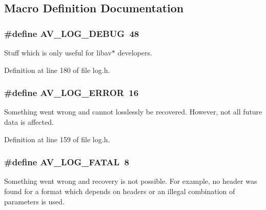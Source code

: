 \subsection{Macro Definition Documentation}
\subsubsection[{\texorpdfstring{A\+V\+\_\+\+L\+O\+G\+\_\+\+D\+E\+B\+UG}{AV_LOG_DEBUG}}]{\setlength{\rightskip}{0pt plus 5cm}\#define A\+V\+\_\+\+L\+O\+G\+\_\+\+D\+E\+B\+UG~48}\hypertarget{group__lavu__log__constants_ga5b7221c3afd06848486776bd834a58a5}{}\label{group__lavu__log__constants_ga5b7221c3afd06848486776bd834a58a5}
Stuff which is only useful for libav$\ast$ developers. 

Definition at line 180 of file log.\+h.

\subsubsection[{\texorpdfstring{A\+V\+\_\+\+L\+O\+G\+\_\+\+E\+R\+R\+OR}{AV_LOG_ERROR}}]{\setlength{\rightskip}{0pt plus 5cm}\#define A\+V\+\_\+\+L\+O\+G\+\_\+\+E\+R\+R\+OR~16}\hypertarget{group__lavu__log__constants_gaffe151ff4cd8a24b2e77ac8d9616c85c}{}\label{group__lavu__log__constants_gaffe151ff4cd8a24b2e77ac8d9616c85c}
Something went wrong and cannot losslessly be recovered. However, not all future data is affected. 

Definition at line 159 of file log.\+h.

\subsubsection[{\texorpdfstring{A\+V\+\_\+\+L\+O\+G\+\_\+\+F\+A\+T\+AL}{AV_LOG_FATAL}}]{\setlength{\rightskip}{0pt plus 5cm}\#define A\+V\+\_\+\+L\+O\+G\+\_\+\+F\+A\+T\+AL~8}\hypertarget{group__lavu__log__constants_ga96970a2980bf6ad28cd403e7dc52d6c5}{}\label{group__lavu__log__constants_ga96970a2980bf6ad28cd403e7dc52d6c5}
Something went wrong and recovery is not possible. For example, no header was found for a format which depends on headers or an illegal combination of parameters is used. 

